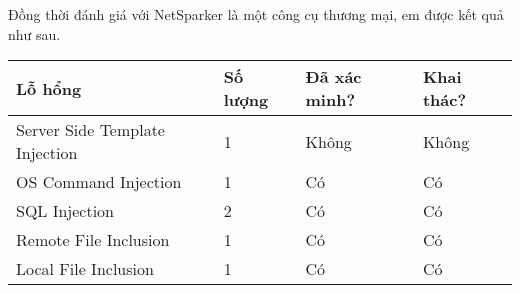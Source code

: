 \documentclass[./../main.tex]{subfiles}
\begin{document}
Đồng thời đánh giá với NetSparker là một công cụ thương mại, em được kết quả như sau.
\begin{table}[]
	\begin{tabular}{|l|l|l|l|}
		\hline
		\textbf{Lỗ hổng}               & \textbf{Số lượng} & \textbf{Đã xác minh?} & \textbf{Khai thác?} \\ \hline
		Server Side Template Injection & 1                 & Không                 & Không               \\ \hline
		OS Command Injection           & 1                 & Có                    & Có                  \\ \hline
		SQL Injection                  & 2                 & Có                    & Có                  \\ \hline
		Remote File Inclusion          & 1                 & Có                    & Có                  \\ \hline
		Local File Inclusion           & 1                 & Có                    & Có                  \\ \hline
	\end{tabular}
\end{table}
\end{document}

